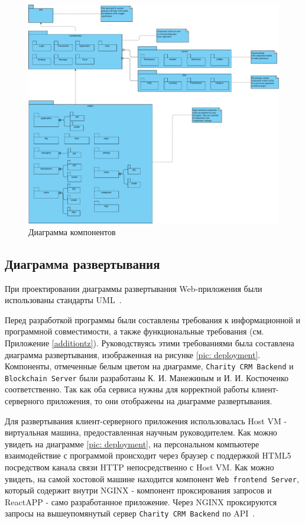 \documentclass[a4paper,12pt,reqno]{article}
\begin{document}
\begin{figure}[H]
		\centering
		\includegraphics[width = 0.9\linewidth]{img/components.pdf}
		\caption{Диаграмма компонентов}
		\label{pic: component}
\end{figure}



\subsection{Диаграмма развертывания}

При проектировании диаграммы развертывания Web-приложения были использованы стандарты UML~\cite{uml}. 

Перед разработкой программы были составлены требования к информационной и программной совместимости, а также функциональные требования (см. Приложение \ref{additiontz}). Руководствуясь этими требованиями была составлена диаграмма развертывания, изображенная на рисунке \ref{pic: deployment}. Компоненты, отмеченные белым цветом на диаграмме, \texttt{Charity CRM Backend} и \texttt{Blockchain Server} были разработаны К. И. Манежиным и И. И. Костюченко соответственно. Так как оба сервиса нужны для корректной работы клиент-серверного приложения, то они отображены на диаграмме развертывания.

Для развертывания клиент-серверного приложения использовалась Host VM - виртуальная машина, предоставленная научным руководителем. Как можно увидеть на диаграмме \ref{pic: deployment}, на персональном компьютере взаимодействие с программой происходит через браузер с поддержкой HTML5 посредством канала связи HTTP непосредственно с Host VM. Как можно увидеть, на самой хостовой машине находится компонент \texttt{Web frontend Server}, который содержит внутри NGINX - компонент проксирования запросов и ReactAPP - само разработанное приложение. Через NGINX проксируются запросы на вышеупомянутый сервер \texttt{Charity CRM Backend} по API~\cite{api}.
\end{document}
